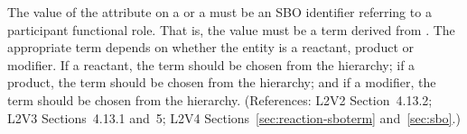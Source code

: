 The value of the  attribute on a \SpeciesReference or a
\ModifierSpeciesReference must be an SBO identifier referring to a
participant functional role.  That is, the value must be a term derived
from \sboparticipantfunctional.  The appropriate term depends on whether
the entity is a reactant, product or modifier.  If a reactant, the term
should be chosen from the \sboreactant hierarchy; if a product, the term
should be chosen from the \sboproduct hierarchy; and if a modifier, the
term should be chosen from the \sbomodifier hierarchy.  (References: 
L2V2 Section~4.13.2; L2V3 Sections~4.13.1 and~5; L2V4 Sections~\ref{sec:reaction-sboterm} and~\ref{sec:sbo}.)
